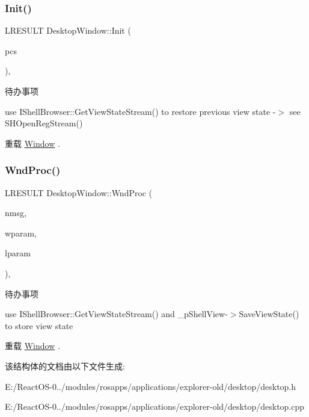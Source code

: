 \subsubsection{\texorpdfstring{Init()}{Init()}}
{\footnotesize\ttfamily L\+R\+E\+S\+U\+LT Desktop\+Window\+::\+Init (\begin{DoxyParamCaption}\item[{\hyperlink{structtag_c_r_e_a_t_e_s_t_r_u_c_t_a}{L\+P\+C\+R\+E\+A\+T\+E\+S\+T\+R\+U\+CT}}]{pcs }\end{DoxyParamCaption})\hspace{0.3cm}{\ttfamily [protected]}, {\ttfamily [virtual]}}

\begin{DoxyRefDesc}{待办事项}
\item[\hyperlink{todo__todo000011}{待办事项}]use I\+Shell\+Browser\+::\+Get\+View\+State\+Stream() to restore previous view state -\/$>$ see S\+H\+Open\+Reg\+Stream() \end{DoxyRefDesc}


重载 \hyperlink{struct_window}{Window} .

\mbox{\label{struct_desktop_window_aef29a0eb3bfc089a83ad8627c2ecadaf}} 
\subsubsection{\texorpdfstring{Wnd\+Proc()}{WndProc()}}
{\footnotesize\ttfamily L\+R\+E\+S\+U\+LT Desktop\+Window\+::\+Wnd\+Proc (\begin{DoxyParamCaption}\item[{U\+I\+NT}]{nmsg,  }\item[{W\+P\+A\+R\+AM}]{wparam,  }\item[{L\+P\+A\+R\+AM}]{lparam }\end{DoxyParamCaption})\hspace{0.3cm}{\ttfamily [protected]}, {\ttfamily [virtual]}}

\begin{DoxyRefDesc}{待办事项}
\item[\hyperlink{todo__todo000012}{待办事项}]use I\+Shell\+Browser\+::\+Get\+View\+State\+Stream() and \+\_\+p\+Shell\+View-\/$>$Save\+View\+State() to store view state \end{DoxyRefDesc}


重载 \hyperlink{struct_window}{Window} .



该结构体的文档由以下文件生成\+:\begin{DoxyCompactItemize}
\item 
E\+:/\+React\+O\+S-\/0../modules/rosapps/applications/explorer-\/old/desktop/desktop.\+h\item 
E\+:/\+React\+O\+S-\/0../modules/rosapps/applications/explorer-\/old/desktop/desktop.\+cpp\end{DoxyCompactItemize}
